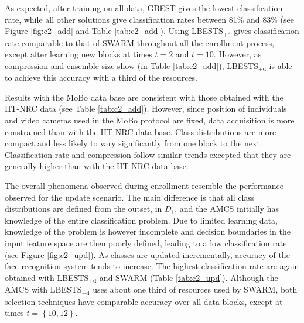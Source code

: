 As expected, after training on all data, GBEST gives the lowest classification rate, while all other solutions give classification rates between 81\% and 83\% (see Figure \ref{fig:c2_add} and Table \ref{tab:c2_add}).
Using LBESTS$_\text{+d}$ gives classification rate comparable to that of SWARM throughout all the enrollment process, except after learning new blocks at times $t=2$ and $t=10$.
However, as compression and ensemble size show (in Table \ref{tab:c2_add}), LBESTS$_\text{+d}$ is able to achieve this accuracy with a third of the resources.

Results with the MoBo data base are consistent with those obtained with the IIT-NRC data (see Table \ref{tab:c2_add}).
However, since position of individuals and video cameras used in the MoBo protocol are fixed, data acquisition is more constrained than with the IIT-NRC data base.
Class distributions are more compact and less likely to vary significantly from one block to the next.
Classification rate and compression follow similar trends excepted that they are generally higher than with the IIT-NRC data base.

The overall phenomena observed during enrollment resemble the performance observed for the update scenario.
The main difference is that all class distributions are defined from the outset, in $D_1$, and the AMCS initially has knowledge of the entire classification problem.
Due to limited learning data, knowledge of the problem is however incomplete and decision boundaries in the input feature space are then poorly defined, leading to a low classification rate (see Figure \ref{fig:c2_upd}).
As classes are updated incrementally, accuracy of the face recognition system tends to increase.
The highest classification rate are again obtained with LBESTS$_\text{+d}$ and SWARM (Table \ref{tab:c2_upd}).
Although the AMCS with LBESTS$_\text{+d}$ uses about one third of resources used by SWARM, both selection techniques have comparable accuracy over all data blocks, except at times $t=\left\{10,12\right\}$.


